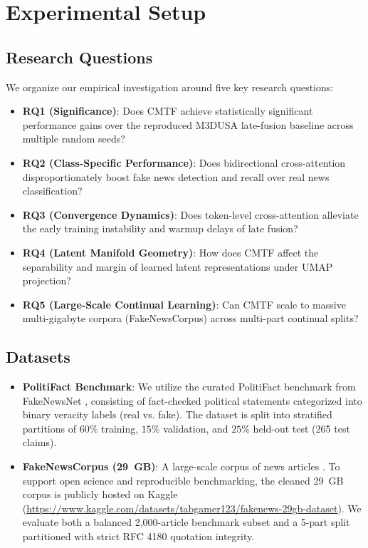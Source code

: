 \documentclass[conference]{IEEEtran}
\begin{document}
\section{Experimental Setup}

\subsection{Research Questions}
We organize our empirical investigation around five key research questions:
\begin{itemize}
    \item \textbf{RQ1 (Significance)}: Does CMTF achieve statistically significant performance gains over the reproduced M3DUSA late-fusion baseline across multiple random seeds?
    \item \textbf{RQ2 (Class-Specific Performance)}: Does bidirectional cross-attention disproportionately boost fake news detection and recall over real news classification?
    \item \textbf{RQ3 (Convergence Dynamics)}: Does token-level cross-attention alleviate the early training instability and warmup delays of late fusion?
    \item \textbf{RQ4 (Latent Manifold Geometry)}: How does CMTF affect the separability and margin of learned latent representations under UMAP projection?
    \item \textbf{RQ5 (Large-Scale Continual Learning)}: Can CMTF scale to massive multi-gigabyte corpora (FakeNewsCorpus) across multi-part continual splits?
\end{itemize}

\subsection{Datasets}
\begin{itemize}
    \item \textbf{PolitiFact Benchmark}: We utilize the curated PolitiFact benchmark from FakeNewsNet \cite{shu2020fakenewsnet}, consisting of fact-checked political statements categorized into binary veracity labels (real vs. fake). The dataset is split into stratified partitions of $60\%$ training, $15\%$ validation, and $25\%$ held-out test (265 test claims).
    \item \textbf{FakeNewsCorpus (29~GB)}: A large-scale corpus of news articles \cite{szigeti2018fakenewscorpus}. To support open science and reproducible benchmarking, the cleaned 29~GB corpus is publicly hosted on Kaggle \cite{tabgamer2026kaggle} (\url{https://www.kaggle.com/datasets/tabgamer123/fakenews-29gb-dataset}). We evaluate both a balanced 2,000-article benchmark subset and a 5-part split partitioned with strict RFC 4180 quotation integrity.
\end{itemize}
\end{document}
